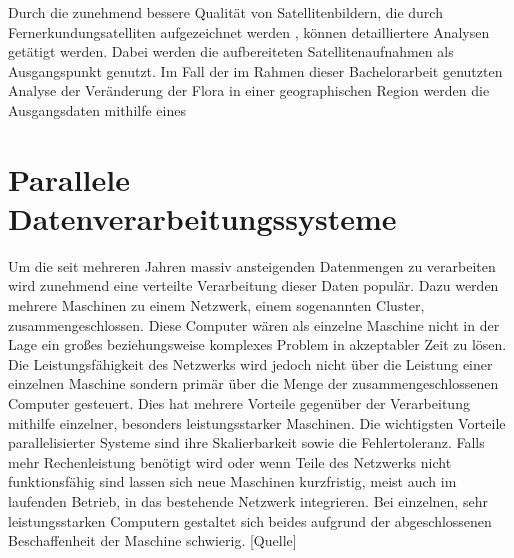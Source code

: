 Durch die zunehmend bessere Qualität von Satellitenbildern, die durch Fernerkundungsatelliten aufgezeichnet werden \cite{Markham2004}, können detailliertere Analysen getätigt werden. Dabei werden die aufbereiteten Satellitenaufnahmen als Ausgangspunkt genutzt. Im Fall der im Rahmen dieser Bachelorarbeit genutzten Analyse der Veränderung der Flora in einer geographischen Region werden die Ausgangsdaten mithilfe eines 

\section{Parallele Datenverarbeitungssysteme}
Um die seit mehreren Jahren massiv ansteigenden Datenmengen \cite{EMC2014} zu verarbeiten wird zunehmend eine verteilte Verarbeitung dieser Daten populär. Dazu werden mehrere Maschinen zu einem Netzwerk, einem sogenannten Cluster, zusammengeschlossen. Diese Computer wären als einzelne Maschine nicht in der Lage ein großes beziehungsweise komplexes Problem in akzeptabler Zeit zu lösen. Die Leistungsfähigkeit des Netzwerks wird jedoch nicht über die Leistung einer einzelnen Maschine sondern primär über die Menge der zusammengeschlossenen Computer gesteuert. Dies hat mehrere Vorteile gegenüber der Verarbeitung mithilfe einzelner, besonders leistungsstarker Maschinen. Die wichtigsten Vorteile parallelisierter Systeme sind ihre Skalierbarkeit sowie die Fehlertoleranz. Falls mehr Rechenleistung benötigt wird oder wenn Teile des Netzwerks nicht funktionsfähig sind lassen sich neue Maschinen kurzfristig, meist auch im laufenden Betrieb, in das bestehende Netzwerk integrieren. Bei einzelnen, sehr leistungsstarken Computern gestaltet sich beides aufgrund der abgeschlossenen Beschaffenheit der Maschine schwierig. [Quelle]

